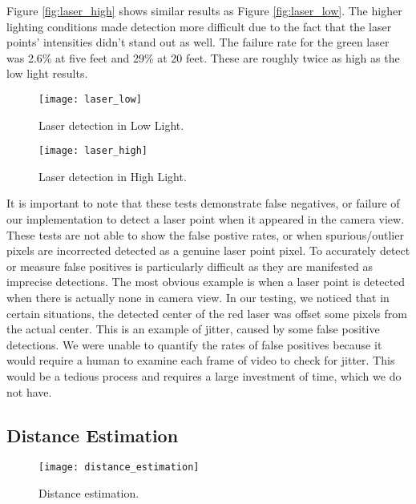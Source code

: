 \documentclass[10pt,twocolumn,letterpaper]{article}
\begin{document}
Figure \ref{fig:laser_high} shows similar results as Figure \ref{fig:laser_low}. The higher lighting conditions made detection more difficult due to the fact that the laser points' intensities didn't stand out as well. The failure rate for the green laser was 2.6\% at five feet and 29\% at 20 feet. These are roughly twice as high as the low light results.

\begin{figure}[t]
\begin{center}
  \texttt{[image: laser\_low]}
\end{center}
   \caption{Laser detection in Low Light.}
\label{fig:laser_low}
\label{fig:long}
\label{fig:onecol}
\end{figure}

\begin{figure}[t]
\begin{center}
  \texttt{[image: laser\_high]}
\end{center}
   \caption{Laser detection in High Light.}
\label{fig:laser_high}
\label{fig:long}
\label{fig:onecol}
\end{figure}

It is important to note that these tests demonstrate false negatives, or failure of our implementation to detect a laser point when it appeared in the camera view.  These tests are not able to show the false postive rates, or when spurious/outlier pixels are incorrected detected as a genuine laser point pixel.  To accurately detect or measure false positives is particularly difficult as they are manifested as imprecise detections.  The most obvious example is when a laser point is detected when there is actually none in camera view.  In our testing, we noticed that in certain situations, the detected center of the red laser was offset some pixels from the actual center.  This is an example of jitter, caused by some false positive detections.  We were unable to quantify the rates of false positives because it would require a human to examine each frame of video to check for jitter.  This would be a tedious process and requires a large investment of time, which we do not have.

\subsection{Distance Estimation}

\begin{figure}[t]
\begin{center}
  \texttt{[image: distance\_estimation]}
\end{center}
   \caption{Distance estimation.}
\label{fig:distance_estimation}
\label{fig:long}
\label{fig:onecol}
\end{figure}
\end{document}
